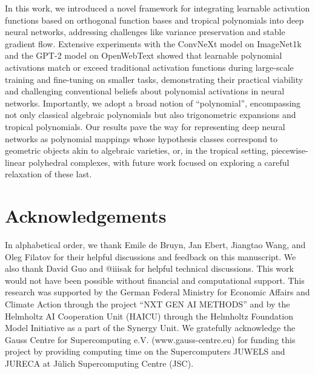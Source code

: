 \documentclass{article} %
\theoremstyle{plain}
\theoremstyle{definition}
\theoremstyle{remark}
\begin{document}
In this work, we introduced a novel framework for integrating learnable activation functions based on orthogonal function bases and tropical polynomials into deep neural networks, addressing challenges like variance preservation and stable gradient flow. Extensive experiments with the ConvNeXt model on ImageNet1k and the GPT-2 model on OpenWebText showed that learnable polynomial activations match or exceed traditional activation functions during large-scale training and fine-tuning on smaller tasks, demonstrating their practical viability and challenging conventional beliefs about polynomial activations in neural networks. Importantly, we adopt a broad notion of “polynomial”, encompassing not only classical algebraic polynomials but also trigonometric expansions and tropical polynomials. Our results pave the way for representing deep neural networks as polynomial mappings whose hypothesis classes correspond to geometric objects akin to algebraic varieties, or, in the tropical setting, piecewise-linear polyhedral complexes, with future work focused on exploring a careful relaxation of these last.

\section*{Acknowledgements}
In alphabetical order, we thank Emile de Bruyn, Jan Ebert, Jiangtao Wang, and Oleg Filatov for their helpful discussions and feedback on this manuscript. We also thank David Guo and @iiisak for helpful technical discussions. This work would not have been possible without financial and computational support. This research was supported by the German Federal Ministry for Economic Affairs and Climate Action through the project “NXT GEN AI METHODS” and by the Helmholtz AI Cooperation Unit
(HAICU) through the Helmholtz Foundation Model Initiative as a part of the Synergy Unit. We gratefully acknowledge the Gauss Centre for Supercomputing e.V. (www.gauss-centre.eu) for funding this project by providing computing time on the Supercomputers JUWELS and JURECA at Jülich Supercomputing Centre (JSC).


\iffalse

\end{document}
